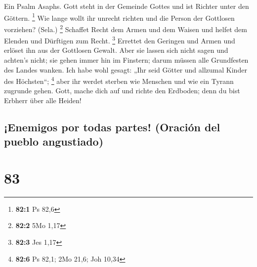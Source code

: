  Ein Psalm Asaphs. Gott steht in der Gemeinde Gottes und
ist Richter unter den Göttern. \footnote{\textbf{82:1} Ps 82,6}
 Wie lange wollt ihr unrecht richten und die Person der
Gottlosen vorziehen? (Sela.) \footnote{\textbf{82:2} 5Mo 1,17}
 Schaffet Recht dem Armen und dem Waisen und helfet dem
Elenden und Dürftigen zum Recht. \footnote{\textbf{82:3} Jes 1,17}
 Errettet den Geringen und Armen und erlöset ihn aus der
Gottlosen Gewalt.  Aber sie lassen sich nicht sagen und
achten's nicht; sie gehen immer hin im Finstern; darum müssen alle
Grundfesten des Landes wanken.  Ich habe wohl gesagt: „Ihr
seid Götter und allzumal Kinder des Höchsten``; \footnote{\textbf{82:6}
  Ps 82,1; 2Mo 21,6; Joh 10,34}  aber ihr werdet sterben
wie Menschen und wie ein Tyrann zugrunde gehen.  Gott,
mache dich auf und richte den Erdboden; denn du bist Erbherr über alle
Heiden!

\hypertarget{enemigos-por-todas-partes-oraciuxf3n-del-pueblo-angustiado}{%
\subsection{¡Enemigos por todas partes! (Oración del pueblo
angustiado)}\label{enemigos-por-todas-partes-oraciuxf3n-del-pueblo-angustiado}}

\hypertarget{section-82}{%
\section{83}\label{section-82}}

